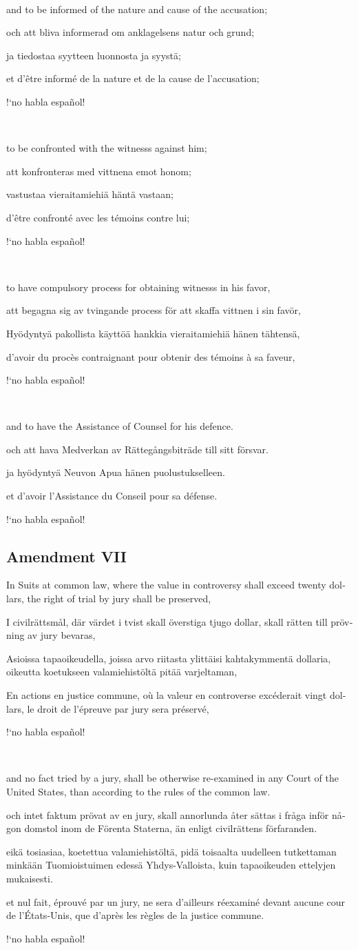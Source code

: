 \documentclass[a4paper,landscape,10pt]{article}
\newcommand{\tblock}[5]{\noindent\begin{minipage}[t]{0.18\textwidth}\foreignlanguage{english}{#1}\end{minipage}\hskip 0.025\textwidth\begin{minipage}[t]{0.18\textwidth}\foreignlanguage{swedish}{#2}\end{minipage}\hskip 0.025\textwidth\begin{minipage}[t]{0.18\textwidth}\foreignlanguage{finnish}{#3}\end{minipage}\hskip 0.025\textwidth\begin{minipage}[t]{0.18\textwidth}\foreignlanguage{french}{#4}\end{minipage}\hskip 0.025\textwidth\begin{minipage}[t]{0.18\textwidth}\foreignlanguage{spanish}{#5}\end{minipage}}
\begin{document}
~

\tblock
{and to be informed of the nature and cause of the accusation;}
{och att bliva informerad om anklagelsens natur och grund;}
{ja tiedostaa syytteen luonnosta ja syystä;}
{et d'être informé de la nature et de la cause de l'accusation;}
{!`no habla español!}

~

\tblock
{to be confronted with the \glspl{witness} against him;}
{att konfronteras med vittnena emot honom;}	
{vastustaa vieraitamiehiä häntä vastaan;}
{d'être confronté avec les témoins contre lui;}
{!`no habla español!}

~

\tblock
{to have compulsory process for obtaining \glspl{witness} in his favor,}
{att begagna sig av tvingande process för att skaffa vittnen i sin favör,}
{Hyödyntyä pakollista käyttöä hankkia vieraitamiehiä hänen tähtensä,}
{d'avoir du procès contraignant pour obtenir des témoins à sa faveur,}
{!`no habla español!}

~

\tblock
{and to have the Assistance of Counsel for his defence.}
{och att hava Medverkan av Rättegångsbiträde till sitt försvar.}
{ja hyödyntyä Neuvon Apua hänen puolustukselleen.}
{et d'avoir l'Assistance du Conseil pour sa défense.}
{!`no habla español!}


\subsection*{Amendment VII}
\tblock
{In Suits at common law, where the value in controversy shall exceed twenty dollars, the right of trial by jury shall be preserved,}
{I civilrättsmål, där värdet i tvist skall överstiga tjugo dollar, skall rätten till prövning av jury bevaras,}
{Asioissa tapaoikeudella, joissa arvo riitasta ylittäisi kahtakymmentä dollaria, oikeutta koetukseen valamiehistöltä pitää varjeltaman,}
{En actions en justice commune, où la valeur en controverse excéderait vingt dollars, le droit de l'épreuve par jury sera préservé,}
{!`no habla español!}

~

\tblock
{and no fact tried by a jury, shall be otherwise re-examined in any Court of the United States, than according to the rules of the common law.}
{och intet faktum prövat av en jury, skall annorlunda åter sättas i fråga inför någon domstol inom de Förenta Staterna, än enligt civilrättens förfaranden.}
{eikä tosiasiaa, koetettua valamiehistöltä, pidä toisaalta uudelleen tutkettaman minkään Tuomioistuimen edessä Yhdys-Valloista, kuin tapaoikeuden ettelyjen mukaisesti.}
{et nul fait, éprouvé par un jury, ne sera d'ailleurs réexaminé devant aucune cour de l'États-Unis, que d'après les règles de la justice commune.}
{!`no habla español!}
\end{document}

